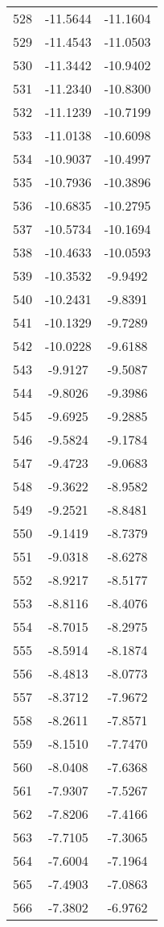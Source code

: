 \documentclass{article}
\begin{document}
\begin{longtable}{|c|c|c|}
528 & -11.5644 & -11.1604 \\
529 & -11.4543 & -11.0503 \\
530 & -11.3442 & -10.9402 \\
531 & -11.2340 & -10.8300 \\
532 & -11.1239 & -10.7199 \\
533 & -11.0138 & -10.6098 \\
534 & -10.9037 & -10.4997 \\
535 & -10.7936 & -10.3896 \\
536 & -10.6835 & -10.2795 \\
537 & -10.5734 & -10.1694 \\
538 & -10.4633 & -10.0593 \\
539 & -10.3532 & -9.9492 \\
540 & -10.2431 & -9.8391 \\
541 & -10.1329 & -9.7289 \\
542 & -10.0228 & -9.6188 \\
543 & -9.9127 & -9.5087 \\
544 & -9.8026 & -9.3986 \\
545 & -9.6925 & -9.2885 \\
546 & -9.5824 & -9.1784 \\
547 & -9.4723 & -9.0683 \\
548 & -9.3622 & -8.9582 \\
549 & -9.2521 & -8.8481 \\
550 & -9.1419 & -8.7379 \\
551 & -9.0318 & -8.6278 \\
552 & -8.9217 & -8.5177 \\
553 & -8.8116 & -8.4076 \\
554 & -8.7015 & -8.2975 \\
555 & -8.5914 & -8.1874 \\
556 & -8.4813 & -8.0773 \\
557 & -8.3712 & -7.9672 \\
558 & -8.2611 & -7.8571 \\
559 & -8.1510 & -7.7470 \\
560 & -8.0408 & -7.6368 \\
561 & -7.9307 & -7.5267 \\
562 & -7.8206 & -7.4166 \\
563 & -7.7105 & -7.3065 \\
564 & -7.6004 & -7.1964 \\
565 & -7.4903 & -7.0863 \\
566 & -7.3802 & -6.9762 \\

\end{longtable}
\end{document}
